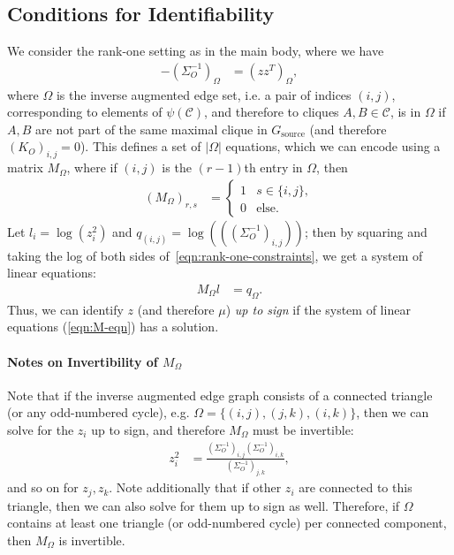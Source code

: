 \documentclass[letterpaper]{article}
\begin{document}
\begin{appendix}
\subsection{Conditions for Identifiability}
\label{appendix:identifiability}
We consider the rank-one setting as in the main body, where we have
\begin{align}
	\label{eqn:rank-one-constraints}
	-(\Sigma_O^{-1})_\Omega
	&=
	\left(zz^T\right)_\Omega,
\end{align}
where $\Omega$ is the inverse augmented edge set, i.e. a pair of indices $(i,j)$, corresponding to elements of $\psi(\mathcal{C})$, and therefore to cliques $A,B \in \mathcal{C}$, is in $\Omega$ if $A,B$ are not part of the same maximal clique in $G_{\text{source}}$ (and therefore $(K_O)_{i,j} = 0$).
This defines a set of $|\Omega|$ equations, which we can encode using a matrix $M_\Omega$, where if $(i,j)$ is the $(r-1)$th entry in $\Omega$, then
\begin{align}
	(M_\Omega)_{r,s}
	&=
	\begin{cases}
		1 & s \in \{i,j\}, \\
		0 & \text{else}.
	\end{cases}
\end{align}
Let $l_i = \log(z_i^2)$ and $q_{(i,j)} = \log(((\Sigma_O^{-1})_{i,j}))$; then by squaring and taking the log of both sides of~\ref{eqn:rank-one-constraints}, we get a system of linear equations:
\begin{align}
	\label{eqn:M-eqn}
	M_\Omega l
	&=
	q_\Omega.
\end{align}
Thus, we can identify $z$ (and therefore $\mu$) \textit{up to sign} if the system of linear equations (\ref{eqn:M-eqn}) has a solution.

\paragraph*{Notes on Invertibility of $M_\Omega$}
Note that if the inverse augmented edge graph consists of a connected triangle (or any odd-numbered cycle), e.g. $\Omega = \{(i,j), (j,k), (i,k)\}$, then we can solve for the $z_i$ up to sign, and therefore $M_\Omega$ must be invertible:
\begin{align*}
	z_i^2
	&=
	\frac{ (\Sigma_O^{-1})_{i,j} (\Sigma_O^{-1})_{i,k} }{ (\Sigma_O^{-1})_{j,k} },
\end{align*}
and so on for $z_j, z_k$.
Note additionally that if other $z_i$ are connected to this triangle, then we can also solve for them up to sign as well.
Therefore, if $\Omega$ contains at least one triangle (or odd-numbered cycle) per connected component, then $M_\Omega$ is invertible.


\end{appendix}
\end{document}
